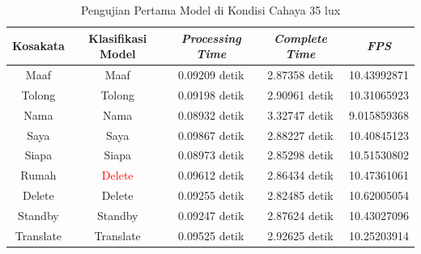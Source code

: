 \begin{longtable}{|c|c|c|c|c|}
  \caption{Pengujian Pertama Model di Kondisi Cahaya 35 lux}
  \label{tb:prediksigelap1}                                   \\
  \hline
  \rowcolor[HTML]{C0C0C0}
  \textbf{Kosakata} & \textbf{Klasifikasi Model} & \textbf{\emph{Processing Time}} & \textbf{\emph{Complete Time}} & \textbf{\emph{FPS}}\\
  \hline
  Maaf              & Maaf                          & 0.09209 detik                           & 2.87358 detik                                  & 10.43992871\\
  Tolong            & Tolong                        & 0.09198 detik                           & 2.90961 detik                                  & 10.31065923\\
  Nama              & Nama                          & 0.08932 detik                           & 3.32747 detik                                  & 9.015859368\\
  Saya              & Saya                          & 0.09867 detik                           & 2.88227 detik                                  & 10.40845123\\
  Siapa             & Siapa                         & 0.08973 detik                           & 2.85298 detik                                  & 10.51530802\\
  Rumah             & \textcolor{red}{Delete}       & 0.09612 detik                           & 2.86434 detik                                  & 10.47361061\\
  Delete            & Delete                        & 0.09255 detik                           & 2.82485 detik                                  & 10.62005054\\
  Standby           & Standby                       & 0.09247 detik                           & 2.87624 detik                                  & 10.43027096\\
  Translate         & Translate                     & 0.09525 detik                           & 2.92625 detik                                  & 10.25203914\\
  \hline
\end{longtable}


